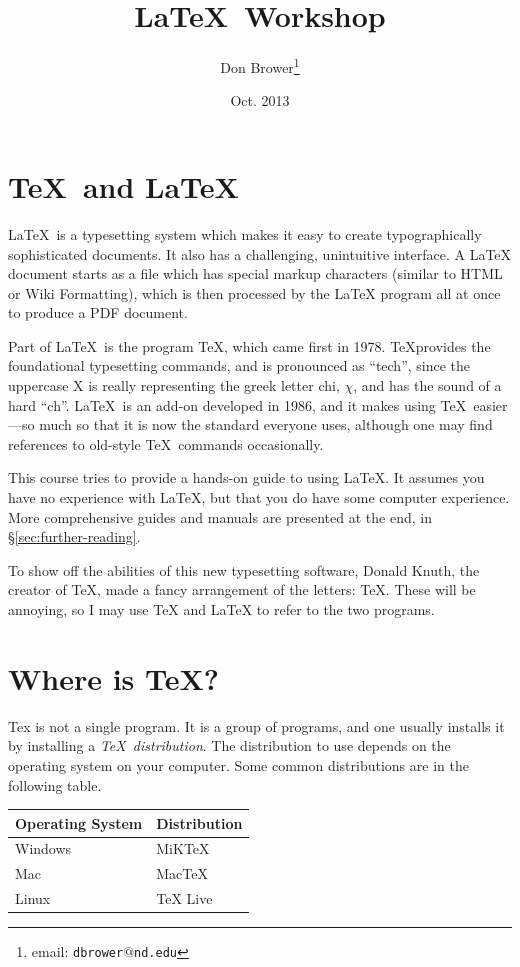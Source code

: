 \documentclass{article}
\begin{document}
\title{\LaTeX\ Workshop}
\author{Don Brower\thanks{email: \texttt{dbrower$@$nd.edu}}}
\date{Oct. 2013}
\maketitle

\section{\TeX\ and \LaTeX}

\LaTeX\ is a typesetting system which makes it easy to create typographically sophisticated documents.
It also has a challenging, unintuitive interface.
A LaTeX document starts as a file which has special markup characters (similar to HTML or Wiki Formatting),
which is then processed by the LaTeX program all at once to produce a PDF document.

Part of \LaTeX\ is the program \TeX, which came first in 1978.
\TeX provides the foundational typesetting commands, and is pronounced
as ``tech'', since the uppercase X is really representing the greek letter chi, $\chi$,
and has the sound of a hard ``ch''.
\LaTeX\ is an add-on developed in 1986, and it makes using \TeX\ easier---so much so that it
is now the standard everyone uses, although one may find references to old-style \TeX\ commands occasionally.

This course tries to provide a hands-on guide to using \LaTeX.
It assumes you have no experience with \LaTeX, but that you do have some computer experience.
More comprehensive guides and manuals are presented at the end, in \S\ref{sec:further-reading}.

To show off the abilities of this new typesetting software, Donald Knuth, the creator of \TeX, made
a fancy arrangement of the letters: \TeX.
These will be annoying, so I may use TeX and LaTeX to refer to the two programs.

\section{Where is \TeX?}

Tex is not a single program.
It is a group of programs, and one usually installs it by installing a \textit{\TeX\ distribution}.
The distribution to use depends on the operating system on your computer.
Some common distributions are in the following table.

\begin{center}
\begin{tabular}{ll}
    \toprule
    Operating System & Distribution \\
    \midrule
    Windows & MiKTeX \\
    Mac & MacTeX \\
    Linux & TeX Live \\
    \bottomrule
\end{tabular}
\end{center}
\end{document}
